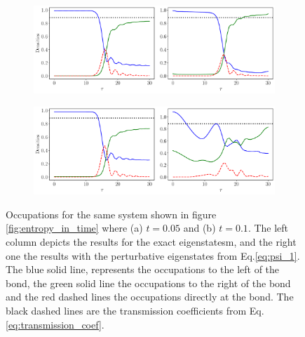 \documentclass{article}
\begin{document}
\begin{figure}[h]
    \centering
    \begin{subfigure}[b]{0.7\textwidth}
        \includegraphics[width=\textwidth]{figures/report_08_2025/occupations_Lqpc=60_Omega=0.4_t=0.05.pdf}
        \caption{}
    \end{subfigure}
    \vspace{0.001\textwidth}
    \begin{subfigure}[b]{0.7\textwidth}
        \includegraphics[width=\textwidth]{figures/report_08_2025/occupations_Lqpc=60_Omega=0.4_t=0.1.pdf}
        \caption{}
    \end{subfigure}
    \caption{Occupations for the same system shown in figure \ref{fig:entropy_in_time} where (a) $t=0.05$ and (b) $t=0.1$. The left column depicts the results for the exact eigenstatesm, and the right one the results with the perturbative eigenstates from Eq.\eqref{eq:psi_1}. The blue solid line, represents the occupations to the left of the bond, the green solid line the occupations to the right of the bond and the red dashed lines the occupations directly at the bond. The black dashed lines are the transmission coefficients from Eq.\eqref{eq:transmission_coef}. }
    \label{fig:occupations}
\end{figure}


%
%
\end{document}
